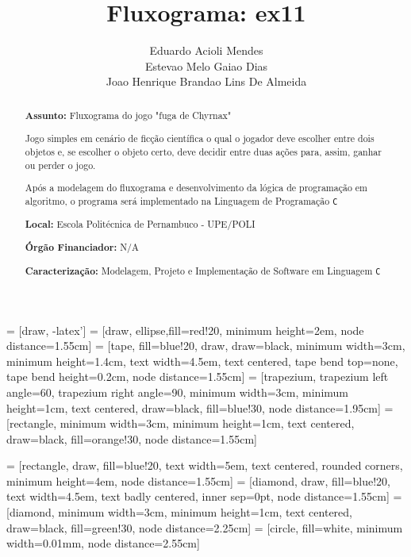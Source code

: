 \documentclass[a4paper,12pt]{article} %
\title{Fluxograma: ex11}
\author{Eduardo Acioli Mendes \\ Estevao Melo Gaiao Dias \\ Joao Henrique Brandao Lins De Almeida }
\begin{document}
\maketitle


 = [draw, -latex']
 = [draw, ellipse,fill=red!20, minimum height=2em, node distance=1.55cm]
 = [tape, fill=blue!20, draw, draw=black, minimum width=3cm, minimum height=1.4cm, text width=4.5em, text centered, tape bend top=none, tape bend height=0.2cm, node distance=1.55cm]
 = [trapezium, trapezium left angle=60, trapezium right angle=90, minimum width=3cm, minimum height=1cm, text centered, draw=black, fill=blue!30, node distance=1.95cm]
 = [rectangle, minimum width=3cm, minimum height=1cm, text centered, draw=black, fill=orange!30, node distance=1.55cm]

 = [rectangle, draw, fill=blue!20, text width=5em, text centered, rounded corners, minimum height=4em, node distance=1.55cm]
 = [diamond, draw, fill=blue!20, text width=4.5em, text badly centered, inner sep=0pt, node distance=1.55cm]
 = [diamond, minimum width=3cm, minimum height=1cm, text centered, draw=black, fill=green!30, node distance=2.25cm]
 = [circle, fill=white, minimum width=0.01mm, node distance=2.55cm]


\begin{abstract}

\textbf{Assunto:} Fluxograma do jogo "fuga de Chyrnax"


Jogo simples em cenário de ficção científica o qual o jogador deve escolher entre dois objetos e, se escolher o objeto certo, deve decidir entre duas ações para, assim, ganhar ou perder o jogo.

Após a modelagem do fluxograma e desenvolvimento da lógica de programação em algoritmo,
o programa será implementado na Linguagem de Programação \texttt{C}


\textbf{Local:} Escola Politécnica de Pernambuco - UPE/POLI

\textbf{Órgão Financiador:} N/A

\textbf{Caracterização:} Modelagem, Projeto e Implementação de Software em Linguagem \texttt{C}


\end{abstract}
\end{document}
